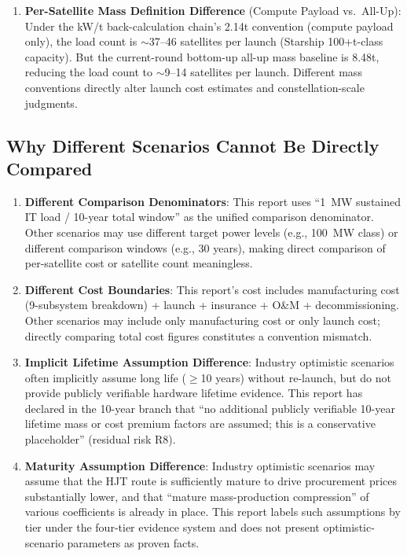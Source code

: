 \begin{enumerate}
  \item \textbf{Per-Satellite Mass Definition Difference} (Compute Payload vs.\ All-Up): Under the kW/t back-calculation chain's 2.14t convention (compute payload only), the load count is $\sim$37--46 satellites per launch (Starship 100+t-class capacity). But the current-round bottom-up all-up mass baseline is 8.48t, reducing the load count to $\sim$9--14 satellites per launch. Different mass conventions directly alter launch cost estimates and constellation-scale judgments.
\end{enumerate}

\subsection{Why Different Scenarios Cannot Be Directly Compared}

\begin{enumerate}
  \item \textbf{Different Comparison Denominators}: This report uses ``1~MW sustained IT load / 10-year total window'' as the unified comparison denominator. Other scenarios may use different target power levels (e.g., 100~MW class) or different comparison windows (e.g., 30 years), making direct comparison of per-satellite cost or satellite count meaningless.

  \item \textbf{Different Cost Boundaries}: This report's cost includes manufacturing cost (9-subsystem breakdown) + launch + insurance + O\&M + decommissioning. Other scenarios may include only manufacturing cost or only launch cost; directly comparing total cost figures constitutes a convention mismatch.

  \item \textbf{Implicit Lifetime Assumption Difference}: Industry optimistic scenarios often implicitly assume long life ($\ge$10 years) without re-launch, but do not provide publicly verifiable hardware lifetime evidence. This report has declared in the 10-year branch that ``no additional publicly verifiable 10-year lifetime mass or cost premium factors are assumed; this is a conservative placeholder'' (residual risk R8).

  \item \textbf{Maturity Assumption Difference}: Industry optimistic scenarios may assume that the HJT route is sufficiently mature to drive procurement prices substantially lower, and that ``mature mass-production compression'' of various coefficients is already in place. This report labels such assumptions by tier under the four-tier evidence system and does not present optimistic-scenario parameters as proven facts.
\end{enumerate}

